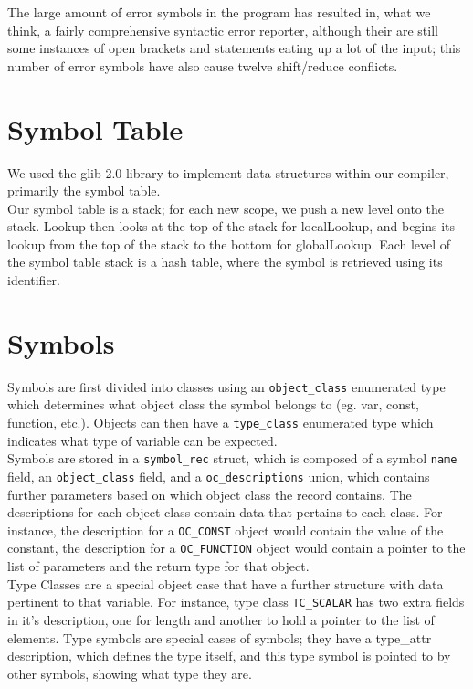 \documentclass{report}
\begin{document}
The large amount of error symbols in the program has resulted in, what we think, a fairly comprehensive syntactic error reporter, although their are still some instances of open brackets and statements eating up a lot of the input; this number of error symbols have also cause twelve shift/reduce conflicts.

\section*{Symbol Table}
We used the glib-2.0 library to implement data structures within our compiler, primarily the symbol table.\\
Our symbol table is a stack; for each new scope, we push a new level onto the stack. Lookup then looks at the top of the stack for localLookup, and begins its lookup from the top of the stack to the bottom for globalLookup. Each level of the symbol table stack is a hash table, where the symbol is retrieved using its identifier.\\

\section*{Symbols}
Symbols are first divided into classes using an \texttt{object\_class} enumerated type which determines what object class the symbol belongs to (eg. var, const, function, etc.). Objects can then have a \texttt{type\_class} enumerated type which indicates what type of variable can be expected. \\
Symbols are stored in a \texttt{symbol\_rec} struct, which is composed of a symbol \texttt{name} field, an \texttt{object\_class} field, and a \texttt{oc\_descriptions} union, which contains further parameters based on which object class the record contains. The descriptions for each object class contain data that pertains to each class. For instance, the description for a \texttt{OC\_CONST} object would contain the value of the constant, the description for a \texttt{OC\_FUNCTION} object would contain a pointer to the list of parameters and the return type for that object.\\
Type Classes are a special object case that have a further structure with data pertinent to that variable. For instance, type class \texttt{TC\_SCALAR} has two extra fields in it's description, one for length and another to hold a pointer to the list of elements. Type symbols are special cases of symbols; they have a type\_attr description, which defines the type itself, and this type symbol is pointed to by other symbols, showing what type they are.\\
\end{document}
